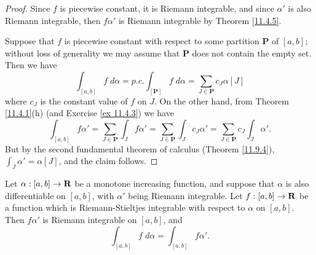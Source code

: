 \begin{proof}
    Since \(f\) is piecewise constant, it is Riemann integrable, and since \(\alpha'\) is also Riemann integrable, then \(f \alpha'\) is Riemann integrable by Theorem \ref{11.4.5}.

    Suppose that \(f\) is piecewise constant with respect to some partition \(\mathbf{P}\) of \([a, b]\);
    without loss of generality we may assume that \(\mathbf{P}\) does not contain the empty set.
    Then we have
    \[
        \int_{[a, b]} f \; d \alpha = p.c. \int_{[\mathbf{P}]} f \; d \alpha = \sum_{J \in \mathbf{P}} c_J \alpha[J]
    \]
    where \(c_J\) is the constant value of \(f\) on \(J\).
    On the other hand, from Theorem \ref{11.4.1}(h) (and Exercise \ref{ex 11.4.3}) we have
    \[
        \int_{[a, b]} f \alpha' = \sum_{J \in \mathbf{P}} \int_J f \alpha' = \sum_{J \in \mathbf{P}} \int_J c_J \alpha' = \sum_{J \in \mathbf{P}} c_J \int_J \alpha'.
    \]
    But by the second fundamental theorem of calculus (Theorem \ref{11.9.4}), \(\int_J \alpha' = \alpha[J]\), and the claim follows.
\end{proof}

\begin{corollary}\label{11.10.3}
    Let \(\alpha : [a, b] \to \mathbf{R}\) be a monotone increasing function, and suppose that \(\alpha\) is also differentiable on \([a, b]\), with \(\alpha'\) being Riemann integrable.
    Let \(f : [a, b] \to \mathbf{R}\) be a function which is Riemann-Stieltjes integrable with respect to \(\alpha\) on \([a, b]\).
    Then \(f \alpha'\) is Riemann integrable on \([a, b]\), and
    \[
        \int_{[a, b]} f \; d \alpha = \int_{[a, b]} f \alpha'.
    \]
\end{corollary}

